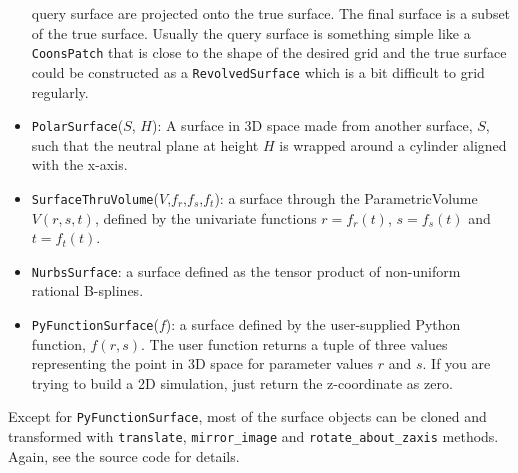 \begin{itemize}
  query surface are projected onto the true surface.
  The final surface is a subset of the true surface.
  Usually the query surface is something simple like a \texttt{CoonsPatch}
  that is close to the shape of the desired grid and
  the true surface could be constructed as a \texttt{RevolvedSurface} which is
  a bit difficult to grid regularly.
\item \texttt{PolarSurface}($S$, $H$): A surface in 3D space made from another surface, $S$,
  such that the neutral plane at height $H$ is wrapped around a cylinder aligned with
  the x-axis.
\item \texttt{SurfaceThruVolume}($V$,$f_r$,$f_s$,$f_t$): a surface through the
  ParametricVolume $V(r,s,t)$, defined by the univariate functions 
  $r=f_r(t)$, $s=f_s(t)$ and $t=f_t(t)$.
\item \texttt{NurbsSurface}: a surface defined as the tensor product of non-uniform rational B-splines.
\item \texttt{PyFunctionSurface}($f$): a surface defined by the user-supplied Python function, $f(r,s)$.
  The user function returns a tuple of three values representing the point in 3D space 
  for parameter values $r$ and $s$.
  If you are trying to build a 2D simulation, just return the z-coordinate as zero.
\end{itemize} 

Except for \texttt{PyFunctionSurface}, most of the surface objects can be cloned and transformed
with \texttt{translate}, \texttt{mirror\_image} and \texttt{rotate\_about\_zaxis} methods.
Again, see the source code for details.


